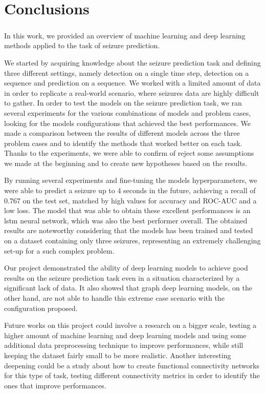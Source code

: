 
\chapter{Conclusions} \label{chap: conclusion}

\paragraph{} In this work, we provided an overview of machine learning and deep learning methods applied to the task of seizure prediction.

We started by acquiring knowledge about the seizure prediction task and defining three different settings, namely detection on a single time step, detection on a sequence and prediction on a sequence. We worked with a limited amount of data in order to replicate a real-world scenario, where seizures data are highly difficult to gather. In order to test the models on the seizure prediction task, we ran several experiments for the various combinations of models and problem cases, looking for the models configurations that achieved the best performances. We made a comparison between the results of different models across the three problem cases and to identify the methods that worked better on each task. Thanks to the experiments, we were able to confirm of reject some assumptions we made at the beginning and to create new hypotheses based on the results.

By running several experiments and fine-tuning the models hyperparameters, we were able to predict a seizure up to 4 seconds in the future, achieving a recall of 0.767 on the test set, matched by high values for accuracy and ROC-AUC and a low loss. The model that was able to obtain these excellent performances is an \acs{lstm} neural network, which was also the best performer overall. The obtained results are noteworthy considering that the models has been trained and tested on a dataset containing only three seizures, representing an extremely challenging set-up for a such complex problem.

Our project demonstrated the ability of deep learning models to achieve good results on the seizure prediction task even in a situation characterized by a significant lack of data. It also showed that graph deep learning models, on the other hand, are not able to handle this extreme case scenario with the configuration proposed.

Future works on this project could involve a research on a bigger scale, testing a higher amount of machine learning and deep learning models and using some additional data preprocessing technique to improve performances, while still keeping the dataset fairly small to be more realistic. Another interesting deepening could be a study about how to create functional connectivity networks for this type of task, testing different connectivity metrics in order to identify the ones that improve performances. 